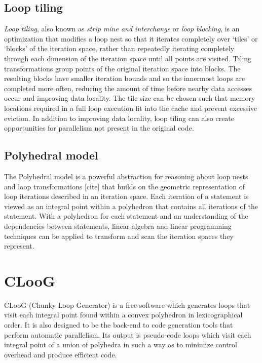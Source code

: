 \documentclass[a4paper,12pt,twoside]{report}
\begin{document}
\subsection*{Loop tiling}
\textit{Loop tiling}, also known as \textit{strip mine and interchange} or \textit{loop blocking}, is an optimization that modifies 
a loop nest so that it iterates completely over `tiles' or `blocks' of the iteration space, rather than repeatedly iterating 
completely through each dimension of the iteration space until all points are visited. Tiling transformations group points of
the original iteration space into blocks. The resulting blocks have smaller iteration bounds and so the innermost loops are completed more often,
reducing the amount of time before nearby data accesses occur and improving data locality. The tile size can be chosen such that memory locations
required in a full loop execution fit into the cache and prevent excessive eviction. In addition to improving data locality, loop tiling can also 
create opportunities for parallelism not present in the original code.

\subsection*{Polyhedral model}
The Polyhedral model is a powerful abstraction for reasoning about loop nests and loop transformations [cite] that builds on the
geometric representation of loop iterations described in an iteration space. Each iteration of a statement is viewed as an
integral point within a polyhedron that contains all iterations of the statement. With a polyhedron for each statement and an understanding
of the dependencies between statements, linear algebra and linear programming techniques can be applied to transform and scan
the iteration spaces they represent.


\section{CLooG}
CLooG (Chunky Loop Generator) is a free software which generates loops that visit each integral
point found within a convex polyhedron in lexicographical order. It is also designed to be
the back-end to code generation tools that perform automatic parallelism. Its output is pseudo-code loops which visit
each integral point of a union of polyhedra in such a way as to minimize control overhead and produce efficient code.
\end{document}
